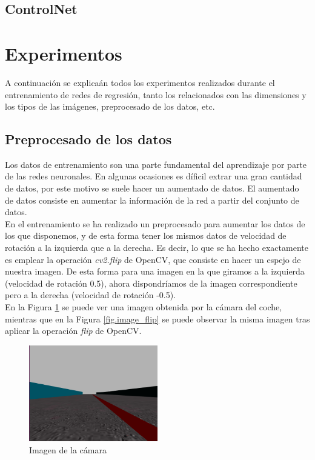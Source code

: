 \subsection{ControlNet}

\section{Experimentos}

A continuación se explicaán todos los experimentos realizados durante el entrenamiento de redes de regresión, tanto los relacionados con las dimensiones y los tipos de las imágenes, preprocesado de los datos, etc. \\

\subsection{Preprocesado de los datos}

Los datos de entrenamiento son una parte fundamental del aprendizaje por parte de las redes neuronales. En algunas ocasiones es díficil extrar una gran cantidad de datos, por este motivo se suele hacer un aumentado de datos. El aumentado de datos consiste en aumentar la información de la red a partir del conjunto de datos.\\

En el entrenamiento se ha realizado un preprocesado para aumentar los datos de los que disponemos, y de esta forma tener los mismos datos de velocidad de rotación a la izquierda que a la derecha. Es decir, lo que se ha hecho exactamente es emplear la operación \textit{cv2.flip} de OpenCV, que consiste en hacer un espejo de nuestra imagen. De esta forma para una imagen en la que giramos a la izquierda (velocidad de rotación 0.5), ahora dispondríamos de la imagen correspondiente pero a la derecha (velocidad de rotación -0.5).\\

En la Figura \ref{fig.image_camera} se puede ver una imagen obtenida por la cámara del coche, mientras que en la Figura \ref{fig.image_flip} se puede observar la misma imagen tras aplicar la operación \textit{flip} de OpenCV.\\


\begin{figure}
\begin{center}
	\includegraphics[width=0.5\textwidth]{figures/Regresion/img_normal.png}
   \caption{Imagen de la cámara}
	\label{fig.image_camera}
\end{center}
\end{figure}

